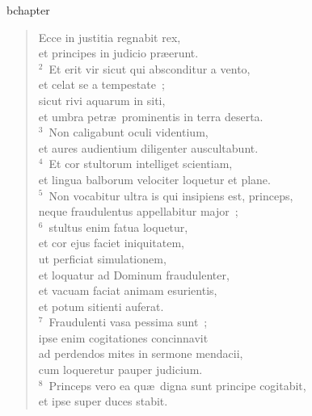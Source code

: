bchapter\begin{verse}\vspace{-19pt}Ecce in justitia regnabit rex,\\ et principes in judicio pr\ae erunt.\\
${}^{2}$~Et erit vir sicut qui absconditur a vento,\\ et celat se a tempestate~;\\ sicut rivi aquarum in siti,\\ et umbra petr\ae\ prominentis in terra deserta.\\
${}^{3}$~Non caligabunt oculi videntium,\\ et aures audientium diligenter auscultabunt.\\
${}^{4}$~Et cor stultorum intelliget scientiam,\\ et lingua balborum velociter loquetur et plane.\\
${}^{5}$~Non vocabitur ultra is qui insipiens est, princeps,\\ neque fraudulentus appellabitur major~;\\
${}^{6}$~stultus enim fatua loquetur,\\ et cor ejus faciet iniquitatem,\\ ut perficiat simulationem,\\ et loquatur ad Dominum fraudulenter,\\ et vacuam faciat animam esurientis,\\ et potum sitienti auferat.\\
${}^{7}$~Fraudulenti vasa pessima sunt~;\\ ipse enim cogitationes concinnavit\\ ad perdendos mites in sermone mendacii,\\ cum loqueretur pauper judicium.\\
${}^{8}$~Princeps vero ea qu\ae\ digna sunt principe cogitabit,\\ et ipse super duces stabit.\end{verse}


